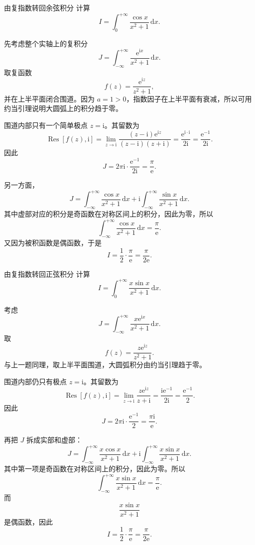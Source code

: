 \begin{lizi}{由复指数转回余弦积分}{}
计算
\[
    I=\int_0^{+\infty}\frac{\cos x}{x^2+1}\,\mathrm{d}x.
\]

\begin{jie}
先考虑整个实轴上的复积分
\[
    J=\int_{-\infty}^{+\infty}\frac{\mathrm{e}^{\mathrm{i}x}}{x^2+1}\,\mathrm{d}x.
\]
取复函数
\[
    f(z)=\frac{\mathrm{e}^{\mathrm{i}z}}{z^2+1},
\]
并在上半平面闭合围道。因为 $a=1>0$，指数因子在上半平面有衰减，所以可用约当引理说明大圆弧上的积分趋于零。

围道内部只有一个简单极点 $z=\mathrm{i}$。其留数为
\[
    \operatorname{Res}[f(z),\mathrm{i}]
    =
    \lim_{z\to \mathrm{i}}
    \frac{(z-\mathrm{i})\mathrm{e}^{\mathrm{i}z}}{(z-\mathrm{i})(z+\mathrm{i})}
    =
    \frac{\mathrm{e}^{\mathrm{i}\cdot \mathrm{i}}}{2\mathrm{i}}
    =
    \frac{\mathrm{e}^{-1}}{2\mathrm{i}}.
\]
因此
\[
    J
    =
    2\pi \mathrm{i}\cdot \frac{\mathrm{e}^{-1}}{2\mathrm{i}}
    =
    \frac{\pi}{\mathrm{e}}.
\]

另一方面，
\[
    J
    =
    \int_{-\infty}^{+\infty}\frac{\cos x}{x^2+1}\,\mathrm{d}x
    +
    \mathrm{i}
    \int_{-\infty}^{+\infty}\frac{\sin x}{x^2+1}\,\mathrm{d}x.
\]
其中虚部对应的积分是奇函数在对称区间上的积分，因此为零，所以
\[
    \int_{-\infty}^{+\infty}\frac{\cos x}{x^2+1}\,\mathrm{d}x
    =
    \frac{\pi}{\mathrm{e}}.
\]
又因为被积函数是偶函数，于是
\[
    I
    =
    \frac{1}{2}\cdot \frac{\pi}{\mathrm{e}}
    =
    \frac{\pi}{2\mathrm{e}}.
\]
\end{jie}
\end{lizi}

\begin{lizi}{由复指数转回正弦积分}{}
计算
\[
    I=\int_0^{+\infty}\frac{x\sin x}{x^2+1}\,\mathrm{d}x.
\]

\begin{jie}
考虑
\[
    J=\int_{-\infty}^{+\infty}\frac{x\mathrm{e}^{\mathrm{i}x}}{x^2+1}\,\mathrm{d}x.
\]
取
\[
    f(z)=\frac{z\mathrm{e}^{\mathrm{i}z}}{z^2+1}.
\]
与上一题同理，取上半平面围道，大圆弧积分由约当引理趋于零。

围道内部仍只有极点 $z=\mathrm{i}$。其留数为
\[
    \operatorname{Res}[f(z),\mathrm{i}]
    =
    \lim_{z\to \mathrm{i}}
    \frac{z\mathrm{e}^{\mathrm{i}z}}{z+\mathrm{i}}
    =
    \frac{\mathrm{i}\mathrm{e}^{-1}}{2\mathrm{i}}
    =
    \frac{\mathrm{e}^{-1}}{2}.
\]
因此
\[
    J=2\pi \mathrm{i}\cdot \frac{\mathrm{e}^{-1}}{2}
    =
    \frac{\pi \mathrm{i}}{\mathrm{e}}.
\]

再把 $J$ 拆成实部和虚部：
\[
    J
    =
    \int_{-\infty}^{+\infty}\frac{x\cos x}{x^2+1}\,\mathrm{d}x
    +
    \mathrm{i}
    \int_{-\infty}^{+\infty}\frac{x\sin x}{x^2+1}\,\mathrm{d}x.
\]
其中第一项是奇函数在对称区间上的积分，因此为零。所以
\[
    \int_{-\infty}^{+\infty}\frac{x\sin x}{x^2+1}\,\mathrm{d}x
    =
    \frac{\pi}{\mathrm{e}}.
\]
而
\[
    \frac{x\sin x}{x^2+1}
\]
是偶函数，因此
\[
    I
    =
    \frac{1}{2}\cdot \frac{\pi}{\mathrm{e}}
    =
    \frac{\pi}{2\mathrm{e}}.
\]
\end{jie}
\end{lizi}

